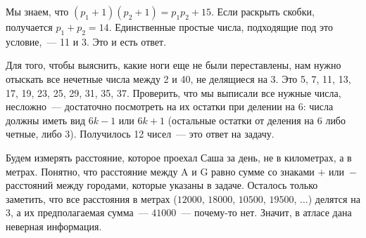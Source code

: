 ﻿
\begin{itemize}
\itA Мы знаем, что $(p_1+1)(p_2+1) = p_1p_2 + 15$. Если раскрыть скобки, получается $p_1 + p_2 = 14$. Единственные простые числа, подходящие под это условие,~— 11 и 3. Это и есть ответ.

\itB Для того, чтобы выяснить, какие ноги еще не были переставлены, нам нужно отыскать все нечетные числа между 2 и 40, не делящиеся на 3. Это 5, 7, 11, 13, 17, 19, 23, 25, 29, 31, 35, 37. Проверить, что мы выписали все нужные числа, несложно~— достаточно посмотреть на их остатки при делении на 6: числа должны иметь вид $6k-1$ или $6k+1$ (остальные остатки от деления на 6 либо четные, либо 3). Получилось 12 чисел~— это ответ на задачу.

\itC Будем измерять расстояние, которое проехал Саша за день, не в километрах, а в метрах. Понятно, что расстояние между A и G равно сумме со знаками $+$ или~$-$ расстояний между городами, которые указаны в задаче. Осталось только заметить, что все расстояния в метрах ($12000$, $18000$, $10500$, $19500$, $\ldots$) делятся на 3, а их предполагаемая сумма~— $41000$~— почему-то нет. Значит, в атласе дана неверная информация.
\end{itemize}